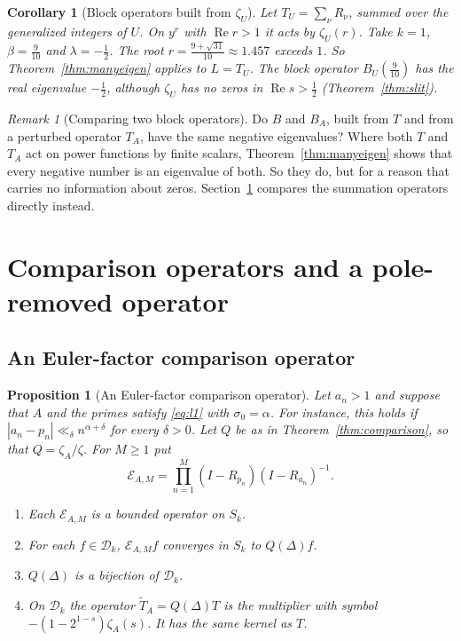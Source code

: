 \documentclass[12pt,letterpaper]{article}
\newtheorem{proposition}[theorem]{Proposition}
\newtheorem{corollary}[theorem]{Corollary}
\theoremstyle{definition}
\theoremstyle{remark}
\newtheorem{remark}[theorem]{Remark}
\numberwithin{equation}{section}
\newcommand{\Ree}{\operatorname{Re}}
\newcommand{\Dk}{\mathcal{D}_k}
\begin{document}
\begin{corollary}[Block operators built from $\zeta_U$]\label{cor:thm6false}
Let $T_U=\sum_\nu R_\nu$, summed over the generalized integers of $U$. On
$y^r$ with $\Ree r>1$ it acts by $\zeta_U(r)$. Take $k=1$,
$\beta=\frac{9}{10}$ and $\lambda=-\frac12$. The root
$r=\frac{9+\sqrt{31}}{10}\approx1.457$ exceeds $1$. So
Theorem~\ref{thm:manyeigen} applies to $L=T_U$. The block operator
$B_U(\frac{9}{10})$ has the real eigenvalue $-\frac12$, although
$\zeta_U$ has no zeros in $\Ree s>\frac12$ (Theorem~\ref{thm:slit}).
\end{corollary}

\begin{remark}[Comparing two block operators]\label{rem:thm5}
Do $B$ and $B_A$, built from $T$ and from a perturbed operator $T_A$,
have the same negative eigenvalues?  Where both $T$ and $T_A$ act on power
functions by finite scalars, Theorem~\ref{thm:manyeigen} shows that every
negative number is an eigenvalue of both.  So they do, but for a reason
that carries no information about zeros.  Section~\ref{sec:replace}
compares the summation operators directly instead.
\end{remark}

\section{Comparison operators and a pole-removed operator}\label{sec:replace}

\subsection{An Euler-factor comparison operator}

\begin{proposition}[An Euler-factor comparison operator]\label{prop:EA}
Let $a_n>1$ and suppose that $A$ and the primes satisfy \eqref{eq:l1} with
$\sigma_0=\alpha$. For instance, this holds if $|a_n-p_n|\ll_\delta
n^{\alpha+\delta}$ for every $\delta>0$. Let $Q$ be as in
Theorem~\ref{thm:comparison}, so that $Q=\zeta_A/\zeta$. For $M\ge1$ put
\[
\mathcal E_{A,M}=\prod_{n=1}^M(I-R_{p_n})(I-R_{a_n})^{-1}.
\]
\begin{enumerate}[label=(\roman*)]
\item Each $\mathcal E_{A,M}$ is a bounded operator on $S_k$.
\item For each $f\in\Dk$, $\mathcal E_{A,M}f$ converges in $S_k$ to
  $Q(\Delta)f$.
\item $Q(\Delta)$ is a bijection of $\Dk$.
\item On $\Dk$ the operator $\widetilde T_A=Q(\Delta)T$ is the multiplier
  with symbol $-(1-2^{1-s})\zeta_A(s)$. It has the same kernel as $T$.
\end{enumerate}
\end{proposition}
\end{document}

